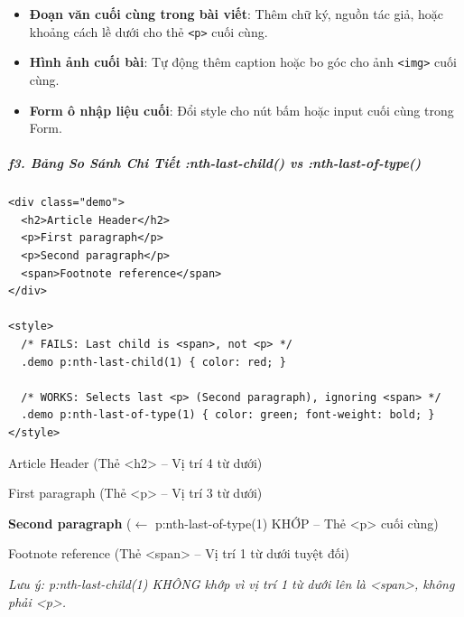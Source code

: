 \documentclass[11pt,oneside]{book}
\newcommand{\codeinline}[1]{\textcolor{accentOrange}{\texttt{#1}}}
\begin{document}
\begin{conceptBox}
\begin{itemize}[leftmargin=1.5em, itemsep=3pt, parsep=0pt]
    \item \textbf{Đoạn văn cuối cùng trong bài viết}: Thêm chữ ký, nguồn tác giả, hoặc khoảng cách lề dưới cho thẻ \codeinline{<p>} cuối cùng.
    \item \textbf{Hình ảnh cuối bài}: Tự động thêm caption hoặc bo góc cho ảnh \codeinline{<img>} cuối cùng.
    \item \textbf{Form ô nhập liệu cuối}: Đổi style cho nút bấm hoặc input cuối cùng trong Form.
\end{itemize}
\end{conceptBox}


\subparagraph{f3. Bảng So Sánh Chi Tiết :nth-last-child() vs :nth-last-of-type()}
\mbox{}\par\vspace{2pt}

\begin{codeWindow}
\begin{lstlisting}[language=HTML5]
<div class="demo">
  <h2>Article Header</h2>
  <p>First paragraph</p>
  <p>Second paragraph</p>
  <span>Footnote reference</span>
</div>

<style>
  /* FAILS: Last child is <span>, not <p> */
  .demo p:nth-last-child(1) { color: red; }

  /* WORKS: Selects last <p> (Second paragraph), ignoring <span> */
  .demo p:nth-last-of-type(1) { color: green; font-weight: bold; }
</style>
\end{lstlisting}
\end{codeWindow}

\begin{browserWindow}
\sffamily\small
Article Header {\scriptsize\textcolor{gray!60}{(Thẻ <h2> -- Vị trí 4 từ dưới)}} \par\vspace{2pt}
First paragraph {\scriptsize\textcolor{gray!60}{(Thẻ <p> -- Vị trí 3 từ dưới)}} \par\vspace{2pt}
\textcolor{green!70!black}{\textbf{Second paragraph}} {\scriptsize\textcolor{gray!60}{($\leftarrow$ p:nth-last-of-type(1) KHỚP -- Thẻ <p> cuối cùng)}} \par\vspace{2pt}
Footnote reference {\scriptsize\textcolor{gray!60}{(Thẻ <span> -- Vị trí 1 từ dưới tuyệt đối)}} \par\vspace{4pt}
{\scriptsize\textcolor{gray!60}{\textit{Lưu ý: p:nth-last-child(1) KHÔNG khớp vì vị trí 1 từ dưới lên là <span>, không phải <p>.}}}
\end{browserWindow}
\end{document}

